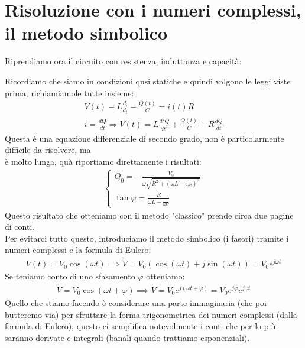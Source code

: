 \documentclass[a4paper, oneside]{article}
\begin{document}
\section*{Risoluzione con i numeri complessi, il metodo simbolico}
Riprendiamo ora il circuito con resistenza, induttanza e capacità:
\begin{center}
\end{center}
Ricordiamo che siamo in condizioni qusi statiche e quindi valgono le leggi viste prima, richiamiamole tutte insieme:
\begin{gather*}
    V(t) - L \frac{d_i}{d_t} - \frac{Q(t)}{C} = i(t) R\\
    i = \frac{dQ}{dt} \Rightarrow V(t) = L \frac{d^2 Q}{d t^2} + \frac{Q(t)}{C} + R \frac{dQ}{dt}
\end{gather*}
Questa è una equazione differenziale di secondo grado, non è particolarmente difficile da risolvere, ma\\
è molto lunga, quà riportiamo direttamente i risultati:
\begin{gather*}
\begin{cases}
    Q_0 = -\frac{V_0}{\omega \sqrt{R^2 + (\omega L - \frac{1}{\omega C})^2}}\\
    \tan \varphi = \frac{R}{\omega L - \frac{1}{\omega C}}
\end{cases}
\end{gather*}
Questo risultato che otteniamo con il metodo "classico" prende circa due pagine di conti.\\
Per evitarci tutto questo, introduciamo il metodo simbolico (i fasori) tramite i numeri complessi e la formula di Eulero:
\begin{gather*}
    V(t) = V_0 \cos(\omega t) \implies \tilde{V} = V_0 (\cos(\omega t) + j \sin(\omega t)) = V_0 e^{j \omega t}
\end{gather*}
Se teniamo conto di uno sfasamento $\varphi$ otteniamo:
\begin{gather*}
    \tilde{V} = V_0 \cos(\omega t + \varphi) \implies \tilde{V} = V_0 e^{j (\omega t + \varphi)} = V_0 e^{j \varphi} e^{j \omega t}
\end{gather*}
Quello che stiamo facendo è considerare una parte immaginaria (che poi butteremo via) per sfruttare la forma trigonometrica 
dei numeri complessi (dalla formula di Eulero), questo ci semplifica notevolmente i conti che per lo più saranno derivate e integrali (banali quando trattiamo esponenziali).\\
\end{document}
